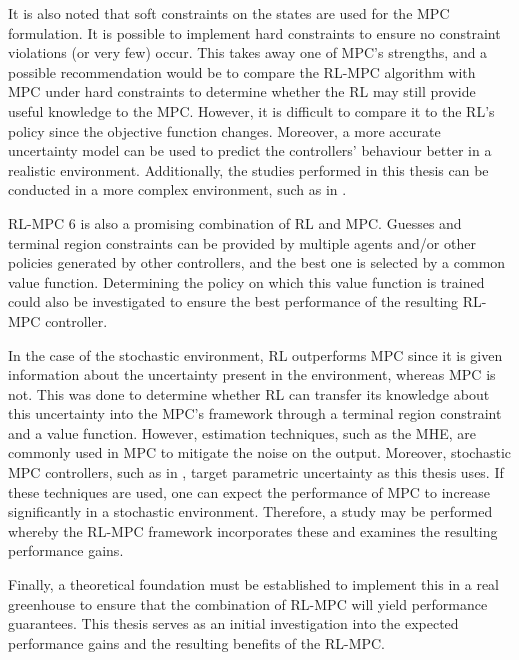 It is also noted that soft constraints on the states are used for the MPC formulation. It is possible to implement hard constraints to ensure no constraint violations (or very few) occur. This takes away one of MPC’s strengths, and a possible recommendation would be to compare the RL-MPC algorithm with MPC under hard constraints to determine whether the RL may still provide useful knowledge to the MPC. However, it is difficult to compare it to the RL’s policy since the objective function changes. Moreover, a more accurate uncertainty model can be used to predict the controllers' behaviour better in a realistic environment. Additionally, the studies performed in this thesis can be conducted in a more complex environment, such as in \citet{GreenLightOpenSource2020}.

RL-MPC 6 is also a promising combination of RL and MPC. Guesses and terminal region constraints can be provided by multiple agents and/or other policies generated by other controllers, and the best one is selected by a common value function. Determining the policy on which this value function is trained could also be investigated to ensure the best performance of the resulting RL-MPC controller.

In the case of the stochastic environment, RL outperforms MPC since it is given information about the uncertainty present in the environment, whereas MPC is not. This was done to determine whether RL can transfer its knowledge about this uncertainty into the MPC’s framework through a terminal region constraint and a value function. However, estimation techniques, such as the MHE, are commonly used in MPC to mitigate the noise on the output. Moreover, stochastic MPC controllers, such as in , target parametric uncertainty as this thesis uses. If these techniques are used, one can expect the performance of MPC to increase significantly in a stochastic environment. Therefore, a study may be performed whereby the RL-MPC framework incorporates these and examines the resulting performance gains.

Finally, a theoretical foundation must be established to implement this in a real greenhouse to ensure that the combination of RL-MPC will yield performance guarantees. This thesis serves as an initial investigation into the expected performance gains and the resulting benefits of the RL-MPC.